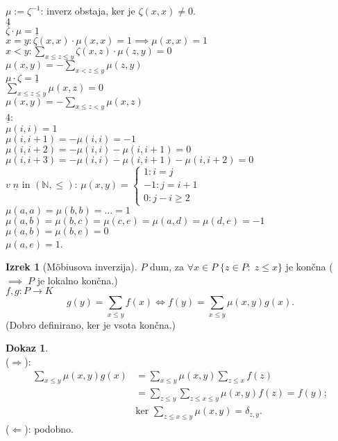 \documentclass[a4paper, 12pt]{book}
\theoremstyle{definition}
\newtheorem{theorem}[counter]{Izrek}
\newtheorem{pro}[counter]{Dokaz}
\theoremstyle{remark}
\newcommand{\N}{\mathbb{N}}
\begin{document}
$\mu := \zeta^{-1}$: inverz obstaja, ker je $\zeta(x,x) \neq 0$. \\
$\underline{4}$ \\
$\zeta \cdot \mu = \underline{1}$ \\
$x = y: \zeta(x,x) \cdot \mu(x,x) = 1 \implies \mu(x,x) = 1$ \\
$x < y: \sum_{x \leq z \leq y} \zeta(x,z) \cdot \mu(z, y) = 0$ \\
$\mu(x,y) = -\sum_{x < z \leq y} \mu(z, y)$ \\
$\mu \cdot \zeta = \underline{1}$ \\
$\sum_{x \leq z \leq y} \mu(x, z) = 0$ \\
$\mu(x,y) = -\sum_{x \leq z < y} \mu(x, z)$ \\
$\underline{4}$: \\
$\mu(i, i) = 1$ \\
$\mu(i, i+1) = -\mu(i, i) = -1$ \\
$\mu(i, i+2) = -\mu(i, i) - \mu(i, i+1) = 0$ \\
$\mu(i, i+3) = -\mu(i, i) - \mu(i, i+1) - \mu(i, i+2) = 0$ \\
$v \; \underline{n}$ in $(\N, \leq)$:
$\mu(x,y) = \begin{cases}
  1: i = j \\
  -1: j = i + 1 \\
  0: j - i \geq 2
\end{cases}$ \\
$\mu(a, a) = \mu(b, b ) = \dots = 1$ \\
$\mu(a, b) = \mu(b, c) = \mu(c, e) = \mu(a, d) = \mu(d, e) = -1$ \\
$\mu(a, b) = \mu(b, e) = 0$ \\
$\mu(a, e) = 1$.
\begin{theorem}[Möbiusova inverzija]
  $P$ dum, za $\forall x \in P \; \{z \in P: \; z \leq x\}$ je končna ($\implies \; P$ je lokalno končna.) \\
  $f, g: P \to K$ \\
  \begin{equation*}
    g(y) = \sum_{x \leq y} f(x) \iff f(y) = \sum_{x \leq y} \mu(x, y) g(x).
  \end{equation*}
  (Dobro definirano, ker je vsota končna.)
\end{theorem}
\begin{pro} \text{} \\
  ($\Rightarrow$):
  \begin{align*}
    \sum_{x \leq y} \mu(x, y) g(x) &= \sum_{x \leq y} \mu(x, y) \sum_{z \leq x} f(z) \\
    &= \sum_{z \leq y} \sum_{z \leq x \leq y} \mu(x, y) f(z) = f(y); \\
    &\text{ker } \sum_{z \leq x \leq y} \mu(x, y) = \delta_{z, y}.
  \end{align*}
  ($\Leftarrow$): podobno.
\end{pro}
\end{document}
